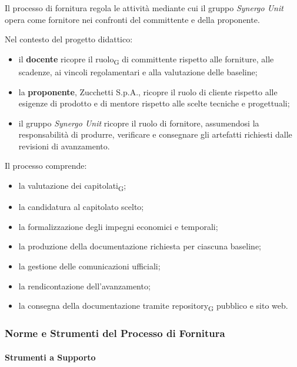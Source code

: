 Il processo di fornitura regola le attività mediante cui il gruppo
\textit{Synergo Unit} opera come fornitore nei confronti del committente e della
proponente.

Nel contesto del progetto didattico:

\begin{itemize}
    \item il \textbf{docente} ricopre il ruolo\textsubscript{G} di committente rispetto alle forniture,
    alle scadenze, ai vincoli regolamentari e alla valutazione delle baseline;

    \item la \textbf{proponente}, Zucchetti S.p.A., ricopre il ruolo
    di cliente rispetto alle esigenze di prodotto e di mentore rispetto alle
    scelte tecniche e progettuali;

    \item il gruppo \textit{Synergo Unit} ricopre il ruolo di fornitore, assumendosi
    la responsabilità di produrre, verificare e consegnare gli artefatti richiesti
    dalle revisioni di avanzamento.
\end{itemize}

Il processo comprende:

\begin{itemize}
    \item la valutazione dei capitolati\textsubscript{G};
    \item la candidatura al capitolato scelto;
    \item la formalizzazione degli impegni economici e temporali;
    \item la produzione della documentazione richiesta per ciascuna baseline;
    \item la gestione delle comunicazioni ufficiali;
    \item la rendicontazione dell'avanzamento;
    \item la consegna della documentazione tramite repository\textsubscript{G} pubblico e sito web.
\end{itemize}


\subsubsection{Norme e Strumenti del Processo di Fornitura}

\paragraph{Strumenti a Supporto}

